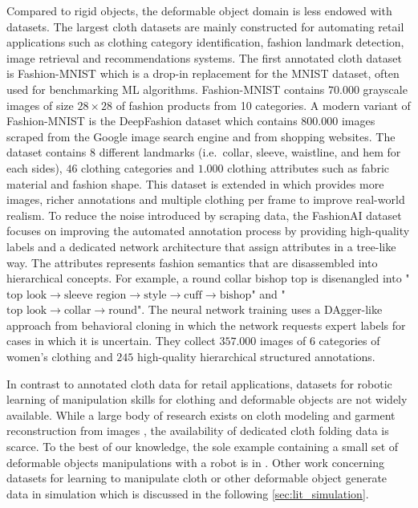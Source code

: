 \documentclass[\home/main.tex]{subfiles}
\begin{document}
Compared to rigid objects, the deformable object domain is less endowed with datasets. The largest cloth datasets are mainly constructed for automating retail applications such as clothing category identification, fashion landmark detection, image retrieval and recommendations systems. The first annotated cloth dataset is Fashion-MNIST \autocite{fashionmnist} which is a drop-in replacement for the MNIST dataset, often used for benchmarking ML algorithms. Fashion-MNIST contains $70.000$ grayscale images of size $28\times28$ of fashion products from 10 categories. A modern variant of Fashion-MNIST is the DeepFashion \autocite{DeepFashion} dataset which contains $800.000$ images scraped from the Google image search engine and from shopping websites. The dataset contains $8$ different landmarks (i.e.\ collar, sleeve, waistline, and hem for each sides), $46$ clothing categories and $1.000$ clothing attributes such as fabric material and fashion shape. This dataset is extended in \autocite{DeepFashion2} which provides more images, richer annotations and multiple clothing per frame to improve real-world realism. To reduce the noise introduced by scraping data, the FashionAI \autocite{FashionAI} dataset focuses on improving the automated annotation process by providing high-quality labels and a dedicated network architecture that assign attributes in a tree-like way. The attributes represents fashion semantics that are disassembled into hierarchical concepts. For example, a round collar bishop top is disenangled into "$\text{top look} \rightarrow \text{sleeve region} \rightarrow \text{style} \rightarrow \text{cuff} \rightarrow \text{bishop}$" and  "$\text{top look} \rightarrow \text{collar} \rightarrow \text{round}$". The neural network training uses a DAgger-like approach from behavioral cloning in which the network requests expert labels for cases in which it is uncertain. They collect $357.000$ images of $6$ categories of women's clothing and $245$ high-quality hierarchical structured annotations.

In contrast to annotated cloth data for retail applications, datasets for robotic learning of manipulation skills for clothing and deformable objects are not widely available. While a large body of research exists on cloth modeling and garment reconstruction from images \autocite{bertiche2020cloth3d,deepfashion3d,Wang20183dgarment}, the availability of dedicated cloth folding data is scarce. To the best of our knowledge, the sole example containing a small set of deformable objects manipulations with a robot is in \autocite{mandlekar2018roboturk}. Other work concerning datasets for learning to manipulate cloth or other deformable object generate data in simulation which is discussed in the following \cref{sec:lit_simulation}.
\end{document}
